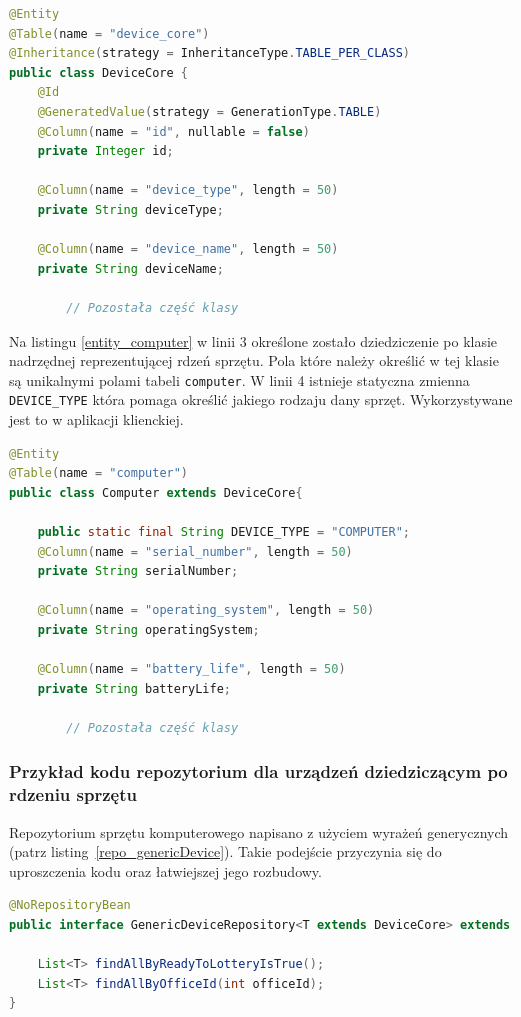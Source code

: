 \begin{lstlisting}[language=Java, style=JavaStyle, caption={Klasa nadrzędna reprezentująca rdzeń sprzętu: \texttt{DeviceCore}}, label={entity_deviceCore}]
@Entity
@Table(name = "device_core")
@Inheritance(strategy = InheritanceType.TABLE_PER_CLASS)
public class DeviceCore {
    @Id
    @GeneratedValue(strategy = GenerationType.TABLE)
    @Column(name = "id", nullable = false)
    private Integer id;

    @Column(name = "device_type", length = 50)
    private String deviceType;

    @Column(name = "device_name", length = 50)
    private String deviceName;
		
		// Pozostała część klasy

\end{lstlisting}

Na listingu \ref{entity_computer} w linii 3 określone zostało dziedziczenie po klasie nadrzędnej reprezentującej rdzeń sprzętu. Pola które należy określić w tej klasie są unikalnymi polami tabeli \texttt{computer}. W linii 4 istnieje statyczna zmienna \texttt{DEVICE\_TYPE} która pomaga określić jakiego rodzaju dany sprzęt. Wykorzystywane jest to w aplikacji klienckiej.

\begin{lstlisting}[language=Java, style=JavaStyle,  caption={Klasa potomna: Computer, reprezentująca komputer}, label={entity_computer}]
@Entity
@Table(name = "computer")
public class Computer extends DeviceCore{

    public static final String DEVICE_TYPE = "COMPUTER";
    @Column(name = "serial_number", length = 50)
    private String serialNumber;

    @Column(name = "operating_system", length = 50)
    private String operatingSystem;

    @Column(name = "battery_life", length = 50)
    private String batteryLife;
		
		// Pozostała część klasy
\end{lstlisting}


\subsubsection{Przykład kodu repozytorium dla urządzeń dziedziczącym po rdzeniu sprzętu}
Repozytorium sprzętu komputerowego napisano z użyciem wyrażeń generycznych (patrz listing~\ref{repo_genericDevice}). Takie podejście przyczynia się do uproszczenia kodu oraz łatwiejszej jego rozbudowy.
\begin{lstlisting}[language=Java, style=JavaStyle,  caption={Generyczne repozytorium sprzętu komputerowego:  GenericDeviceRepository}, label={repo_genericDevice}]
@NoRepositoryBean
public interface GenericDeviceRepository<T extends DeviceCore> extends JpaRepository<T, Integer> {
    
    List<T> findAllByReadyToLotteryIsTrue();
    List<T> findAllByOfficeId(int officeId);
}
\end{lstlisting}

